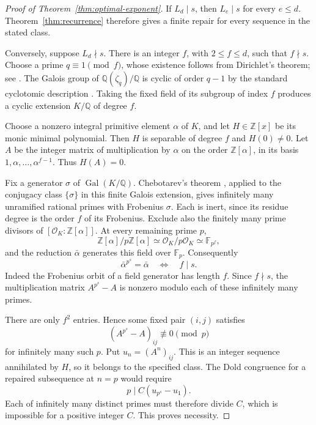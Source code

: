 \documentclass[11pt]{article}
\theoremstyle{remark}
\begin{document}
\begin{proof}[Proof of Theorem~\ref{thm:optimal-exponent}]
If $L_d\mid s$, then $L_e\mid s$ for every $e\leq d$. Theorem~\ref{thm:recurrence} therefore gives a finite repair for every sequence in the stated class.

Conversely, suppose $L_d\nmid s$. There is an integer $f$, with $2\leq f\leq d$, such that $f\nmid s$. Choose a prime $q\equiv1\pmod f$, whose existence follows from Dirichlet's theorem; see \cite[Example~8.34]{Milne}. The Galois group of $\mathbb Q(\zeta_q)/\mathbb Q$ is cyclic of order $q-1$ by the standard cyclotomic description \cite[Section~6]{Milne}. Taking the fixed field of its subgroup of index $f$ produces a cyclic extension $K/\mathbb Q$ of degree $f$.

Choose a nonzero integral primitive element $\alpha$ of $K$, and let $H\in\mathbb Z[x]$ be its monic minimal polynomial. Then $H$ is separable of degree $f$ and $H(0)\neq0$. Let $A$ be the integer matrix of multiplication by $\alpha$ on the order $\mathbb Z[\alpha]$, in its basis $1,\alpha,\ldots,\alpha^{f-1}$. Thus $H(A)=0$.

Fix a generator $\sigma$ of $\operatorname{Gal}(K/\mathbb Q)$. Chebotarev's theorem \cite[Theorem~8.31]{Milne}, applied to the conjugacy class $\{\sigma\}$ in this finite Galois extension, gives infinitely many unramified rational primes with Frobenius $\sigma$. Each is inert, since its residue degree is the order $f$ of its Frobenius. Exclude also the finitely many prime divisors of $[\mathcal O_K:\mathbb Z[\alpha]]$. At every remaining prime $p$,
\[
 \mathbb Z[\alpha]/p\mathbb Z[\alpha]
       \simeq\mathcal O_K/p\mathcal O_K\simeq\mathbb F_{p^f},
\]
and the reduction $\bar\alpha$ generates this field over $\mathbb F_p$. Consequently
\[
 \bar\alpha^{p^s}=\bar\alpha\quad\Longleftrightarrow\quad f\mid s.
\]
Indeed the Frobenius orbit of a field generator has length $f$. Since $f\nmid s$, the multiplication matrix $A^{p^s}-A$ is nonzero modulo each of these infinitely many primes.

There are only $f^2$ entries. Hence some fixed pair $(i,j)$ satisfies
\[
 (A^{p^s}-A)_{ij}\not\equiv0\pmod p
\]
for infinitely many such $p$. Put $u_n=(A^n)_{ij}$. This is an integer sequence annihilated by $H$, so it belongs to the specified class. The Dold congruence for a repaired subsequence at $n=p$ would require
\[
 p\mid C(u_{p^s}-u_1).
\]
Each of infinitely many distinct primes must therefore divide $C$, which is impossible for a positive integer $C$. This proves necessity.
\end{proof}
\end{document}
